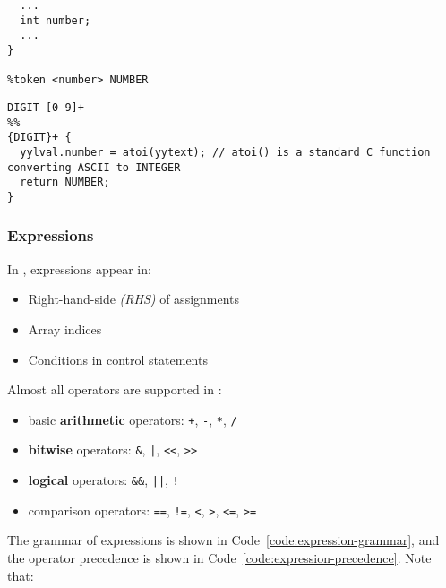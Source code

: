 \documentclass[english]{article}
\begin{document}
\begin{onepage}
  \begin{lstlisting}[language=LANCE, caption={Content of \texttt{Acse.y} file}, label={code:variable-constant-integers-Acse-y}]
%union {
  ...
  int number;
  ...
}

%token <number> NUMBER
\end{lstlisting}
\end{onepage}

\begin{onepage}
  \begin{lstlisting}[language=LANCE, caption={Content of \texttt{Acse.lex} file}, label={code:variable-constant-integers-Acse-lex}]
DIGIT [0-9]+
%%
{DIGIT}+ {
  yylval.number = atoi(yytext); // atoi() is a standard C function converting ASCII to INTEGER
  return NUMBER;
}
\end{lstlisting}
\end{onepage}

\subsubsection{Expressions}

In \lance, expressions appear in:

\begin{itemize}
  \item Right-hand-side \textit{(RHS)} of assignments
  \item Array indices
  \item Conditions in control statements
\end{itemize}

Almost all \clang operators are supported in \lance:

\begin{itemize}
  \item basic \textbf{arithmetic} operators: \texttt{+}, \texttt{-}, \texttt{*}, \texttt{/}
  \item \textbf{bitwise} operators: \texttt{\&}, \texttt{|}, \texttt{<<}, \texttt{>>}
  \item \textbf{logical} operators: \texttt{\&\&}, \texttt{||}, \texttt{!}
  \item comparison operators: \texttt{==}, \texttt{!=}, \texttt{<}, \texttt{>}, \texttt{<=}, \texttt{>=}
\end{itemize}

The grammar of expressions is shown in Code~\ref{code:expression-grammar}, and the operator precedence is shown in Code~\ref{code:expression-precedence}.
Note that:
\end{document}
